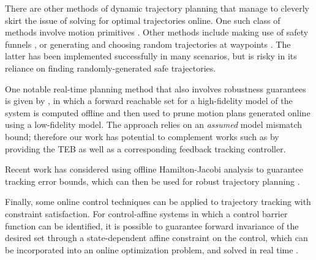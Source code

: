 There are other methods of dynamic trajectory planning that manage to cleverly skirt the issue of solving for optimal trajectories online.  One such class of methods involve motion primitives \cite{Gillula2010, Dey2016}. Other methods include making use of safety funnels \cite{Majumdar2016}, or generating and choosing random trajectories at waypoints \cite{Kalakrishnan2011, Schwesinger2013}. The latter has been implemented successfully in many scenarios, but is risky in its reliance on finding randomly-generated safe trajectories. 

One notable real-time planning method that also involves robustness guarantees is given by \cite{KousikVaskovEtAl2017}, in which a forward reachable set for a high-fidelity model of the system is computed offline and then used to prune motion plans generated online using a low-fidelity model. 
The approach relies on an {\em assumed} model mismatch bound; therefore our work has potential to complement works such as \cite{KousikVaskovEtAl2017} by providing the TEB as well as a corresponding feedback tracking controller.

Recent work has considered using offline Hamilton-Jacobi analysis to guarantee tracking error bounds, which can then be used for robust trajectory planning \cite{Bansal2017}. 

Finally, some online control techniques can be applied to trajectory tracking with constraint satisfaction. For control-affine systems in which a control barrier function can be identified, it is possible to guarantee forward invariance of the desired set through a state-dependent affine constraint on the control, which can be incorporated into an online optimization problem, and solved in real time \cite{Ames2014}. %

